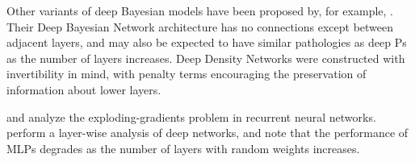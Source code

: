 \documentclass[twoside]{article}
\makeatletter
\newlength{\nonHumbleHeight}
\def\@humbleformat#1{{\settoheight{\nonHumbleHeight}{#1}\resizebox{!}{0.94\nonHumbleHeight}{#1}}}%
\def\humble#1{\@humbleformat{#1}}%
\newcommand{\gp}{{\humble GP}}
\makeatother
\begin{document}
Other variants of deep Bayesian models have been proposed by, for example, \citet{adams2010learning}. %
Their Deep Bayesian Network architecture has no connections except between adjacent layers, and may also be expected to have similar pathologies as deep \gp{}s as the number of layers increases.
%
Deep Density Networks \citep{rippel2013high} were constructed with invertibility in mind, with penalty terms encouraging the preservation of information about lower layers.
%
%


%
\cite{bengio1994learning} and \cite{pascanu2012understanding} analyze the exploding-gradients problem in recurrent neural networks.
%
%
%
\cite{montavon2010layer} perform a layer-wise analysis of deep networks, and note that the performance of MLPs degrades as the number of layers with random weights increases.



\end{document}
